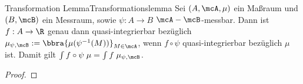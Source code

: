 \begin{msat}{Transformation Lemma}{Transformationslemma}
    Sei $(A,\mcA,\mu)$ ein Maßraum und $(B,\mcB)$ ein Messraum, sowie $\psi:A\to B$ $\mcA-\mcB$-messbar. Dann ist $f:A\to\R$ genau dann quasi-integrierbar bezüglich $\mu_{\psi,\mcB}:=\bbra{\mu(\psi^{-1}(M))}_{M\in\mcA}$, wenn $f\circ\psi$ quasi-integrierbar bezüglich $\mu$ ist. Damit gilt $\int f\circ\psi\;\mu = \int f\;\mu_{\psi,\mcB}$.
\end{msat}
\begin{proof}
    
\end{proof}
